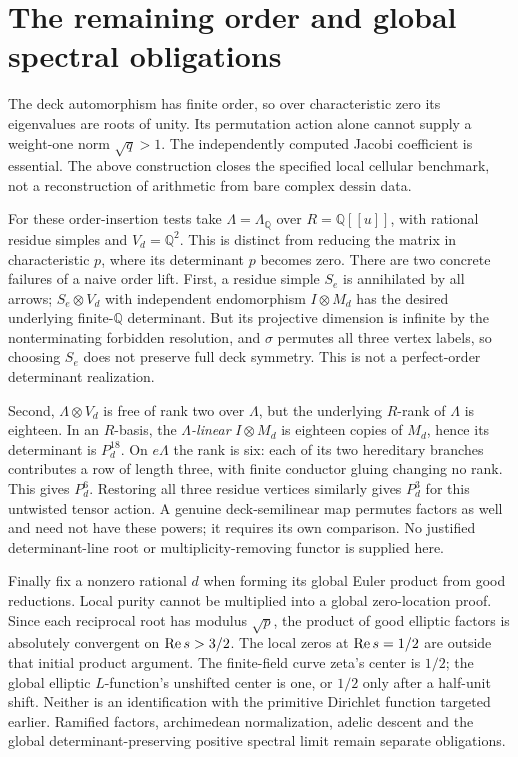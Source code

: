 \section{The remaining order and global spectral obligations}
The deck automorphism has finite order, so over characteristic zero its eigenvalues are roots of unity. Its permutation action alone cannot supply a weight-one norm $\sqrt q>1$. The independently computed Jacobi coefficient is essential. The above construction closes the specified local cellular benchmark, not a reconstruction of arithmetic from bare complex dessin data.

For these order-insertion tests take $\Lambda=\Lambda_{\mathbb{Q}}$ over $R=\mathbb{Q}[[u]]$, with rational residue simples and $V_d=\mathbb{Q}^2$. This is distinct from reducing the matrix in characteristic $p$, where its determinant $p$ becomes zero. There are two concrete failures of a naive order lift. First, a residue simple $S_e$ is annihilated by all arrows; $S_e\otimes V_d$ with independent endomorphism $I\otimes M_d$ has the desired underlying finite-$\mathbb{Q}$ determinant. But its projective dimension is infinite by the nonterminating forbidden resolution, and $\sigma$ permutes all three vertex labels, so choosing $S_e$ does not preserve full deck symmetry. This is not a perfect-order determinant realization.

Second, $\Lambda\otimes V_d$ is free of rank two over $\Lambda$, but the underlying $R$-rank of $\Lambda$ is eighteen. In an $R$-basis, the \emph{$\Lambda$-linear} $I\otimes M_d$ is eighteen copies of $M_d$, hence its determinant is $P_d^{18}$. On $e\Lambda$ the rank is six: each of its two hereditary branches contributes a row of length three, with finite conductor gluing changing no rank. This gives $P_d^6$. Restoring all three residue vertices similarly gives $P_d^3$ for this untwisted tensor action. A genuine deck-semilinear map permutes factors as well and need not have these powers; it requires its own comparison. No justified determinant-line root or multiplicity-removing functor is supplied here.

Finally fix a nonzero rational $d$ when forming its global Euler product from good reductions. Local purity cannot be multiplied into a global zero-location proof. Since each reciprocal root has modulus $\sqrt p$, the product of good elliptic factors is absolutely convergent on $\operatorname{Re} s>3/2$. The local zeros at $\operatorname{Re} s=1/2$ are outside that initial product argument. The finite-field curve zeta's center is $1/2$; the global elliptic $L$-function's unshifted center is one, or $1/2$ only after a half-unit shift. Neither is an identification with the primitive Dirichlet function targeted earlier. Ramified factors, archimedean normalization, adelic descent and the global determinant-preserving positive spectral limit remain separate obligations.



